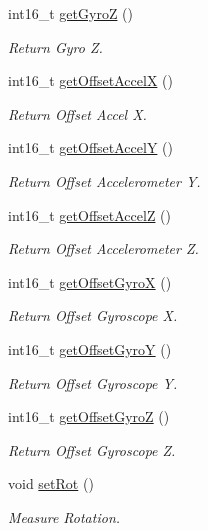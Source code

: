 \begin{DoxyCompactItemize}
int16\+\_\+t \mbox{\hyperlink{class_m_p_u6050_a4caf0233714ab9815e860eba4c167aad}{get\+GyroZ}} ()
\begin{DoxyCompactList}\small\item\em Return Gyro Z. \end{DoxyCompactList}\item 
int16\+\_\+t \mbox{\hyperlink{class_m_p_u6050_ad399b5702208fd9bad445abd25c16182}{get\+Offset\+AccelX}} ()
\begin{DoxyCompactList}\small\item\em Return Offset Accel X. \end{DoxyCompactList}\item 
int16\+\_\+t \mbox{\hyperlink{class_m_p_u6050_a7e5f5deae1205dd2877da8c53f62bafc}{get\+Offset\+AccelY}} ()
\begin{DoxyCompactList}\small\item\em Return Offset Accelerometer Y. \end{DoxyCompactList}\item 
int16\+\_\+t \mbox{\hyperlink{class_m_p_u6050_abc8a1ecec8e5ac7f83d9162ec5c55eb3}{get\+Offset\+AccelZ}} ()
\begin{DoxyCompactList}\small\item\em Return Offset Accelerometer Z. \end{DoxyCompactList}\item 
int16\+\_\+t \mbox{\hyperlink{class_m_p_u6050_a73866ca532c87f446dfd11cf15746054}{get\+Offset\+GyroX}} ()
\begin{DoxyCompactList}\small\item\em Return Offset Gyroscope X. \end{DoxyCompactList}\item 
int16\+\_\+t \mbox{\hyperlink{class_m_p_u6050_a0920360c16a673f8803c9eafebda02ff}{get\+Offset\+GyroY}} ()
\begin{DoxyCompactList}\small\item\em Return Offset Gyroscope Y. \end{DoxyCompactList}\item 
int16\+\_\+t \mbox{\hyperlink{class_m_p_u6050_af55bc5b021562e2b6feee7be362901ac}{get\+Offset\+GyroZ}} ()
\begin{DoxyCompactList}\small\item\em Return Offset Gyroscope Z. \end{DoxyCompactList}\item 
void \mbox{\hyperlink{class_m_p_u6050_a83e29b3477e8953b16111d5d504a5795}{set\+Rot}} ()
\begin{DoxyCompactList}\small\item\em Measure Rotation. \end{DoxyCompactList}\item 

\end{DoxyCompactItemize}
